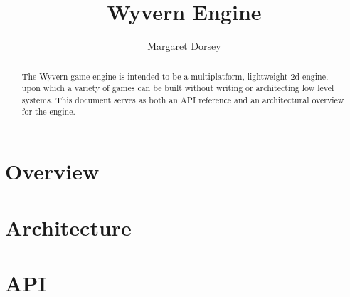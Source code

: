 \documentclass[9pt]{memoir} %
\title{Wyvern Engine}
\author{Margaret Dorsey}
\date{} %
\begin{document}

\begin{titlingpage}
\setlength{\droptitle}{30pt} %
\maketitle

\begin{abstract}

\par The Wyvern game engine is intended to be a multiplatform, lightweight 2d engine, upon which a variety of games can
be built without writing or architecting low level systems. This document serves as both an API reference and an architectural 
overview for the engine.
\end{abstract}
\end{titlingpage}


\section{Overview}

\section{Architecture}

\section{API}
\end{document}
